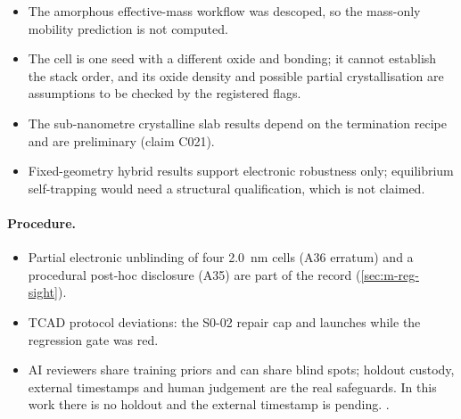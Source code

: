 \begin{itemize}
\item The amorphous effective-mass workflow was descoped, so the mass-only mobility prediction is not computed. %
\item The \HfO{} cell is one seed with a different oxide and bonding; it cannot establish the stack order, and its
oxide density and possible partial crystallisation are assumptions to be checked by the registered flags. %
\item The sub-nanometre crystalline slab results depend on the termination recipe and are preliminary (claim C021). %
\item Fixed-geometry hybrid results support electronic robustness only; equilibrium self-trapping would need a
structural qualification, which is not claimed. %
\end{itemize}

\paragraph{Procedure.}
\begin{itemize}
\item Partial electronic unblinding of four \SI{2.0}{nm} cells (A36 erratum) and a procedural post-hoc disclosure (A35)
are part of the record (\cref{sec:m-reg-sight}). %
\item TCAD protocol deviations: the S0-02 repair cap and launches while the regression gate was red. %
\item AI reviewers share training priors and can share blind spots; holdout custody, external timestamps and human
judgement are the real safeguards. In this work there is no holdout and the external timestamp is pending. %
.
\end{itemize}
